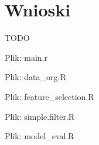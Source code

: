 \documentclass[a4paper,11pt,twoside]{mwrep}  %
\begin{document}
\endgroup

\begingroup
\let\clearpage\relax
\chapter{Wnioski}

TODO\\

\endgroup



\clearpage		
\pagebreak
Plik: main.r

\clearpage

\pagebreak
Plik: data{\_}org.R

\clearpage

\pagebreak
Plik: feature{\_}selection.R

\clearpage

\pagebreak
Plik: simple.filter.R

\clearpage

\pagebreak
Plik: model{\_}eval.R

\clearpage
\end{document}
